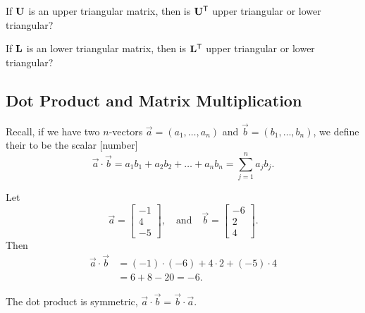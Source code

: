 \begin{problem}
If $\mathbf{U}$ is an upper triangular matrix, then is
$\mathbf{U}^{\mathsf{T}}$ upper triangular or lower triangular?
\end{problem}

\begin{problem}
If $\mathbf{L}$ is an lower triangular matrix, then is
$\mathbf{L}^{\mathsf{T}}$ upper triangular or lower triangular?
\end{problem}

\subsection{Dot Product and Matrix Multiplication}

\begin{definition}
Recall, if we have two $n$-vectors $\vec{a}=(a_{1},\dots,a_{n})$ and
$\vec{b}=(b_{1},\dots,b_{n})$, we define their  to
be the scalar [number]
\begin{equation}
\vec{a}\cdot\vec{b} = a_{1}b_{1} + a_{2}b_{2} + \dots + a_{n}b_{n} = \sum^{n}_{j=1}a_{j}b_{j}.
\end{equation}
\end{definition}

\begin{example}
  Let
  \begin{equation}
\vec{a} = \begin{bmatrix}-1\\4\\-5
\end{bmatrix},\quad\mbox{and}\quad\vec{b}=\begin{bmatrix}
-6\\2\\4
\end{bmatrix}.
  \end{equation}
  Then
  \begin{equation}
    \begin{split}
    \vec{a}\cdot\vec{b} &= (-1)\cdot(-6) + 4\cdot2 + (-5)\cdot 4\\
    &= 6+8-20 = -6.
    \end{split}
  \end{equation}
\end{example}

\begin{proposition}
The dot product is symmetric, $\vec{a}\cdot\vec{b}=\vec{b}\cdot\vec{a}$.
\end{proposition}


